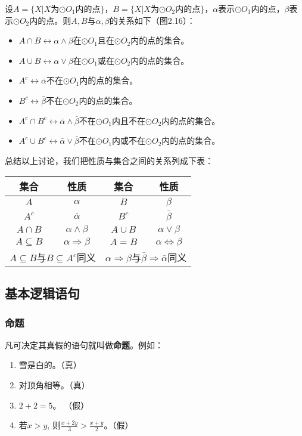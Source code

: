 设$A=\{X|X\text{为$\odot O_1$内的点}\}$，$B=\{X|X\text{为$\odot O_2$内的点}\}$，$\alpha$表示$\odot O_1$内的点，$\beta$表示$\odot O_2$内的点。则$A,B$与$\alpha,\beta$的关系如下（图2.16）：
\begin{itemize}
	\item $A\cap B \longleftrightarrow \alpha\wedge \beta$\quad 在$\odot O_1$且在$\odot O_2$内的点的集合。
	\item $A\cup B\longleftrightarrow \alpha\vee \beta$\quad 在$\odot O_1$或在$\odot O_2$内的点的集合。
	\item $A^c\longleftrightarrow \bar{\alpha}$\quad 不在$\odot O_1$内的点的集合。
	\item $B^c\longleftrightarrow \bar{\beta}$\quad 不在$\odot O_2$内的点的集合。
	\item $A^c\cap B^c\longleftrightarrow \bar\alpha\wedge\bar\beta $\quad 不在$\odot O_1$内且不在$\odot O_2$内的点的集合。
	\item $A^c\cup B^c\longleftrightarrow \bar\alpha\vee\bar\beta$\quad 不在$\odot O_1$内或不在$\odot O_2$内的点的集合。
\end{itemize}

总结以上讨论，我们把性质与集合之间的关系列成下表：
\begin{center}
	\begin{tabular}{cc|cc}
		\hline
		集合  & 性质 &集合  &性质\\
		\hline
		$A$ & $\alpha$ & $B$ & $\beta$\\
		$A^c$ & $\bar\alpha$ & $B^c$ & $\bar\beta$\\
		$A\cap B$ & $\alpha\wedge \beta$ & $A\cup B$ & $\alpha\vee\beta$\\
		$A\subseteq B$ & $\alpha\Rightarrow\beta $& $A=B$&$\alpha\Leftrightarrow \beta$\\
		\multicolumn{2}{c|}{$A\subseteq B$与$B\subseteq A^c$同义}& \multicolumn{2}{|c}{$\alpha\Rightarrow\beta$与$\bar\beta\Rightarrow\bar\alpha$同义}\\
		\hline
	\end{tabular}
\end{center}

\subsection{基本逻辑语句}
\subsubsection{命题}
凡可决定其真假的语句就叫做\textbf{命题}。例如：
\begin{enumerate}
	\item 雪是白的。（真）
	\item 对顶角相等。（真）
	\item $2+2=5$。 （假）
	\item 若$x>y$, 则$\frac{x+2y}{3}>\frac{x+y}{2}$。（假）
\end{enumerate}

